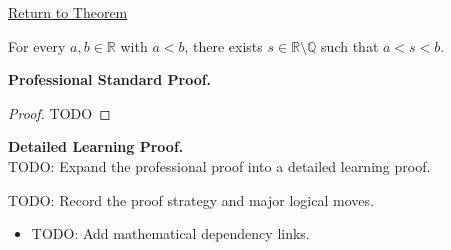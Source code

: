 \newpage
{}
\label{prf:density-of-irrationals-in-reals}

\begin{remark*}[Return]
\hyperref[thm:density-of-irrationals-in-reals]{Return to Theorem}
\end{remark*}

\begin{theorem*}
For every $a,b\in\mathbb{R}$ with $a<b$, there exists $s\in\mathbb{R}\setminus\mathbb{Q}$ such that $a<s<b$.
\end{theorem*}

\textbf{Professional Standard Proof.}~\\
\begin{proof}
TODO
\end{proof}

\textbf{Detailed Learning Proof.}~\\
TODO: Expand the professional proof into a detailed learning proof.

\begin{remark*}
TODO: Record the proof strategy and major logical moves.
\end{remark*}

\begin{dependencies}
\begin{itemize}
  \item TODO: Add mathematical dependency links.
\end{itemize}
\end{dependencies}
